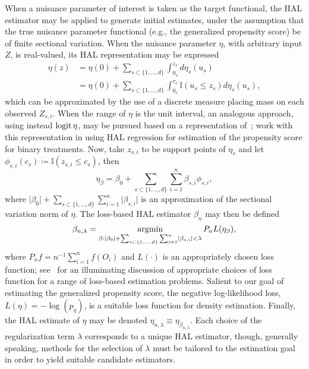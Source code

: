 When a nuisance parameter of interest is taken as the target functional, the HAL
estimator may be applied to generate initial estimates, under the assumption
that the true nuisance parameter functional (e.g., the generalized propensity
score) be of finite sectional variation. When the nuisance parameter $\eta$,
with arbitrary input $Z$, is real-valued, its HAL representation may be
expressed
\begin{align}\label{eq:hal}
  \eta(z) &= \eta(0) + \sum_{s \subset\{1,\ldots,d\}} \int_{0_s}^{z_s} d
  \eta_s(u_s) \nonumber \\ & = \eta(0) + \sum_{s \subset\{1,\ldots,d\}}
  \int_{0_s}^{\tau_s} \mathbb{I}(u_s \leq z_s) d \eta_s(u_s),
\end{align}
which can be approximated by the use of a discrete measure placing mass on each
observed $Z_{s,i}$. When the range of $\eta$ is the unit interval, an analogous
approach, using instead $\operatorname{logit} \eta$, may be pursued based on a representation
of~\citet{gill1995inefficient}; \citet{ertefaie2020nonparametric} work with this
representation in using HAL regression for estimation of the propensity score
for binary treatments. Now, take $z_{s,i}$ to be support points of $\eta_s$ and
let $\phi_{s,i}(c_s) \coloneqq \mathbb{I}(z_{s,i} \leq c_s)$, then
\begin{equation*}
 \eta_\beta = \beta_0 + \sum_{s \subset\{1,\ldots,d\}} \sum_{i=1}^{n}
   \beta_{s,i} \phi_{s,i},
\end{equation*}
where $\lvert \beta_0 \rvert + \sum_{s \subset\{1,\ldots,d\}} \sum_{i=1}^{n}
\lvert \beta_{s,i} \rvert$ is an approximation of the sectional variation norm
of $\eta$. The loss-based HAL estimator $\beta_n$ may then be defined
\begin{equation*}
  \beta_{n, \lambda} = \operatorname*{\arg\!\min}_{\beta: \lvert \beta_0 \rvert + \sum_{s
  \subset\{1,\ldots,d\}} \sum_{i=1}^{n} \lvert \beta_{s,i} \rvert <\lambda} P_n
  L(\eta_{\beta}),
\end{equation*}
where $P_n f = n^{-1} \sum_{i = 1}^n f(O_i)$ and $L(\cdot)$ is an appropriately
chosen loss function; see~\citet{dudoit2005asymptotics} for an illuminating
discussion of appropriate choices of loss function for a range of loss-based
estimation problems. Salient to our goal of estimating the generalized
propensity score, the negative log-likelihood loss, $L(\eta) = -\log(p_{\eta})$,
is a suitable loss function for density estimation. Finally, the HAL estimate of
$\eta$ may be denoted $\eta_{n,\lambda} \equiv \eta_{\beta_{n, \lambda}}$. Each
choice of the regularization term $\lambda$ corresponds to a unique HAL
estimator, though, generally speaking, methods for the selection of $\lambda$
must be tailored to the estimation goal in order to yield suitable candidate
estimators.

